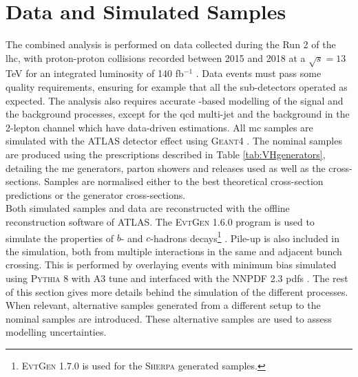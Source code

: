 \section{Data and Simulated Samples}\label{sec-datasets} %
The combined analysis is performed on data collected during the Run 2 of the \gls{lhc}, with proton-proton collisions recorded between 2015 and 2018 at a $\sqrt{s} = 13$ TeV for an integrated luminosity of 140 fb$^{-1}$ \cite{ATLAS:2022hro}. Data events must pass some quality requirements, ensuring for example that all the sub-detectors operated as expected. The analysis also requires accurate -based modelling of the signal and the background processes, except for the \gls{qcd} multi-jet and the \ttb background in the 2-lepton channel which have data-driven estimations. All \gls{mc} samples are simulated with the ATLAS detector effect \cite{ATLASSimulationInfra} using \textsc{Geant4} \cite{Agostinelli:602040}. The nominal samples are produced using the prescriptions described in Table \ref{tab:VHgenerators}, detailing the \gls{me} generators, parton showers and  releases used as well as the cross-sections. Samples are normalised either to the best theoretical cross-section predictions or the generator cross-sections. \\



Both simulated samples and data are reconstructed with the offline reconstruction software of ATLAS. The \textsc{EvtGen} 1.6.0 program is used to simulate the properties of $b$- and $c$-hadrons decays\footnote{\textsc{EvtGen} 1.7.0 is used for the \textsc{Sherpa} generated samples.} \cite{LANGE2001152}. Pile-up is also included in the simulation, both from multiple interactions in the same and adjacent bunch crossing. This is performed by overlaying events with minimum bias simulated using \textsc{\textsc{Pythia}} 8 with A3 tune and interfaced with the \textsc{NNPDF} 2.3 \gls{pdf}s \cite{SJOSTRAND2015159}. The rest of this section gives more details behind the simulation of the different processes. When relevant, alternative samples generated from a different setup to the nominal samples are introduced. These alternative samples are used to assess modelling uncertainties.


